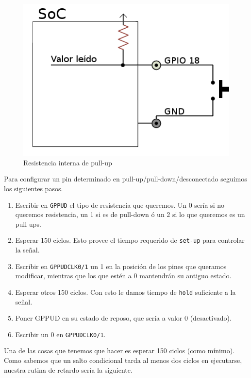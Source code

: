 \begin{figure}[h]
  \centering
    \includegraphics[width=14cm]{graphs/pullup.png}
  \caption{Resistencia interna de pull-up}
  \label{fig:pullup}
\end{figure}

Para configurar un pin determinado en pull-up/pull-down/desconectado seguimos los
siguientes pasos.

\begin{enumerate}
  \item Escribir en {\tt GPPUD} el tipo de resistencia que queremos. Un 0 sería
si no queremos resistencia, un 1 si es de pull-down ó un 2 si lo que queremos es un
pull-ups.
  \item Esperar 150 ciclos. Esto provee el tiempo requerido de {\tt set-up} para controlar la señal.
  \item Escribir en {\tt GPPUDCLK0/1} un 1 en la posición de los pines que queramos modificar,
mientras que los que estén a 0 mantendrán su antiguo estado.
  \item Esperar otros 150 ciclos. Con esto le damos tiempo de {\tt hold} suficiente a la señal.
  \item Poner GPPUD en su estado de reposo, que sería a valor 0 (desactivado).
  \item Escribir un 0 en {\tt GPPUDCLK0/1}.
\end{enumerate}

Una de las cosas que tenemos que hacer es esperar 150 ciclos (como mínimo). Como
sabemos que un salto condicional tarda al menos dos ciclos en ejecutarse, nuestra rutina
de retardo sería la siguiente.


